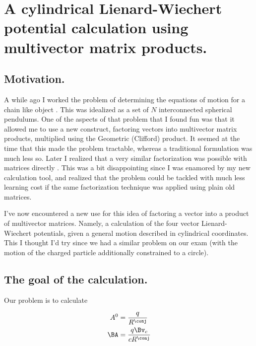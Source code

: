
%

\chapter{A cylindrical Lienard-Wiechert potential calculation using multivector matrix products.}
\label{chap:matrixVectorPotentials}
{}
\date{April 30, 2011}

\beginArtWithToc

\section{Motivation.}

A while ago I worked the problem of determining the equations of motion for a chain like object \cite{multiPendulumSpherical2}.
This was idealized as a set of $N$ interconnected spherical pendulums.  One of the aspects of that problem that I found fun was that it allowed me to use a new construct, factoring vectors into multivector matrix products, multiplied using the Geometric (Clifford) product.  It seemed at the time that this made the problem tractable, whereas a traditional formulation was much less so.  Later I realized that a very similar factorization was possible with matrices directly \cite{multiPendulumSphericalMatrix}.  This was a bit disappointing since I was enamored by my new calculation tool, and realized that the problem could be tackled with much less learning cost if the same factorization technique was applied using plain old matrices.

I've now encountered a new use for this idea of factoring a vector into a product of multivector matrices.  Namely, a calculation of the four vector Lienard-Wiechert potentials, given a general motion described in cylindrical coordinates.  This I thought I'd try since we had a similar problem on our exam (with the motion of the charged particle additionally constrained to a circle).

\section{The goal of the calculation.}

Our problem is to calculate

\begin{align}\label{eqn:matrixVectorPotentials:10}
A^0 &= \frac{q}{R^\conj} \\
\BA &= \frac{q \Bv_c}{c R^\conj}
\end{align}

